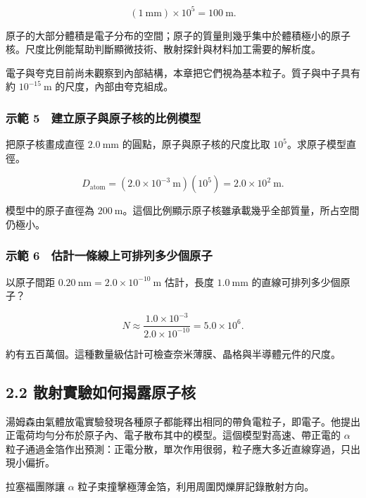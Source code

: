 \documentclass[11pt,a4paper]{article}
\begin{document}
\[
(1\ \mathrm{mm})\times10^5=100\ \mathrm m.
\]

原子的大部分體積是電子分布的空間；原子的質量則幾乎集中於體積極小的原子核。尺度比例能幫助判斷顯微技術、散射探針與材料加工需要的解析度。

電子與夸克目前尚未觀察到內部結構，本章把它們視為基本粒子。質子與中子具有約 \(10^{-15}\ \mathrm m\) 的尺度，內部由夸克組成。

\subsubsection{示範 5　建立原子與原子核的比例模型}\label{ux793aux7bc4-5-ux5efaux7acbux539fux5b50ux8207ux539fux5b50ux6838ux7684ux6bd4ux4f8bux6a21ux578b}

把原子核畫成直徑 \(2.0\ \mathrm{mm}\) 的圓點，原子與原子核的尺度比取 \(10^5\)。求原子模型直徑。

\[
D_{\text{atom}}=(2.0\times10^{-3}\ \mathrm m)(10^5)
=2.0\times10^2\ \mathrm m.
\]

模型中的原子直徑為 \(200\ \mathrm m\)。這個比例顯示原子核雖承載幾乎全部質量，所占空間仍極小。

\subsubsection{示範 6　估計一條線上可排列多少個原子}\label{ux793aux7bc4-6-ux4f30ux8a08ux4e00ux689dux7ddaux4e0aux53efux6392ux5217ux591aux5c11ux500bux539fux5b50}

以原子間距 \(0.20\ \mathrm{nm}=2.0\times10^{-10}\ \mathrm m\) 估計，長度 \(1.0\ \mathrm{mm}\) 的直線可排列多少個原子？

\[
N\approx\frac{1.0\times10^{-3}}{2.0\times10^{-10}}
=5.0\times10^6.
\]

約有五百萬個。這種數量級估計可檢查奈米薄膜、晶格與半導體元件的尺度。

\subsection{2.2 散射實驗如何揭露原子核}\label{ux6563ux5c04ux5be6ux9a57ux5982ux4f55ux63edux9732ux539fux5b50ux6838}

湯姆森由氣體放電實驗發現各種原子都能釋出相同的帶負電粒子，即電子。他提出正電荷均勻分布於原子內、電子散布其中的模型。這個模型對高速、帶正電的 \(\alpha\) 粒子通過金箔作出預測：正電分散，單次作用很弱，粒子應大多近直線穿過，只出現小偏折。

拉塞福團隊讓 \(\alpha\) 粒子束撞擊極薄金箔，利用周圍閃爍屏記錄散射方向。
\end{document}
